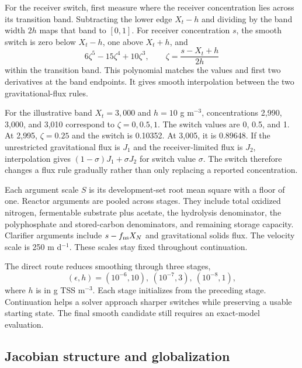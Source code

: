 For the receiver switch, first measure where the receiver concentration lies across its transition band. Subtracting the lower edge $X_t-h$ and dividing by the band width $2h$ maps that band to $[0,1]$. For receiver concentration $s$, the smooth switch is zero below $X_t-h$, one above $X_t+h$, and
\begin{equation}
6\zeta^5-15\zeta^4+10\zeta^3,\qquad
\zeta=\frac{s-X_t+h}{2h}
\label{eq:plant_receiver_switch}
\end{equation}
within the transition band. This polynomial matches the values and first two derivatives at the band endpoints. It gives smooth interpolation between the two gravitational-flux rules.

For the illustrative band $X_t=3{,}000$ and $h=10$ g m$^{-3}$, concentrations 2{,}990, 3{,}000, and 3{,}010 correspond to $\zeta=0,0.5,1$. The switch values are 0, 0.5, and 1. At 2{,}995, $\zeta=0.25$ and the switch is 0.10352. At 3{,}005, it is 0.89648. If the unrestricted gravitational flux is $J_1$ and the receiver-limited flux is $J_2$, interpolation gives $(1-\sigma)J_1+\sigma J_2$ for switch value $\sigma$. The switch therefore changes a flux rule gradually rather than only replacing a reported concentration.

Each argument scale $S$ is its development-set root mean square with a floor of one. Reactor arguments are pooled across stages. They include total oxidized nitrogen, fermentable substrate plus acetate, the hydrolysis denominator, the polyphosphate and stored-carbon denominators, and remaining storage capacity. Clarifier arguments include $s-f_{\rm ns}X_N$ and gravitational solids flux. The velocity scale is 250 m d$^{-1}$. These scales stay fixed throughout continuation.

The direct route reduces smoothing through three stages,
\begin{equation}
(\epsilon,h)=(10^{-6},10),\ (10^{-7},3),\ (10^{-8},1),
\label{eq:plant_continuation_sequence}
\end{equation}
where $h$ is in g TSS m$^{-3}$. Each stage initializes from the preceding stage. Continuation helps a solver approach sharper switches while preserving a usable starting state. The final smooth candidate still requires an exact-model evaluation.

\subsection{Jacobian structure and globalization}

